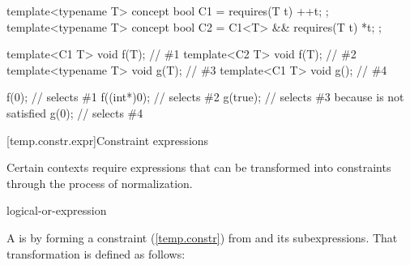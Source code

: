 \enterexample
\begin{codeblock}
template<typename T> concept bool C1 = requires(T t) { ++t; };
template<typename T> concept bool C2 = C1<T> && requires(T t) { *t; };

template<C1 T> void f(T);       // \#1
template<C2 T> void f(T);       // \#2
template<typename T> void g(T); // \#3
template<C1 T> void g();        // \#4

f(0);       // selects \#1
f((int*)0); // selects \#2
g(true);    // selects \#3 because  is not satisfied
g(0);       // selects \#4
\end{codeblock}
\exitexample


[temp.constr.expr]{Constraint expressions}

\pnum
Certain contexts require expressions that can be transformed
into constraints through the process of normalization.
\begin{bnf}
\br
  logical-or-expression
\end{bnf}

\pnum
A 
 is  by forming a constraint 
(\ref{temp.constr}) from
 and its subexpressions.
% 
That transformation is defined as follows:

